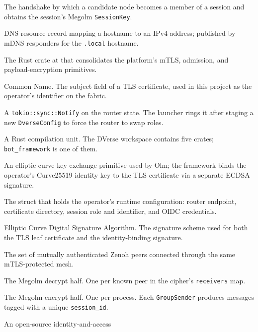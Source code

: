 \documentclass[11pt,a4paper]{article}
\begin{document}
\begin{description}[leftmargin=2.4cm, style=nextline, font=\sffamily\bfseries]
  \item[admission] The handshake by which a candidate node
        becomes a member of a session and obtains the
        session's Megolm \texttt{SessionKey}.
  \item[A record] DNS resource record mapping a hostname to
        an IPv4 address; published by mDNS responders for the
        \texttt{.local} hostname.
  \item[bot\_framework] The Rust crate at
         that consolidates the
        platform's mTLS, admission, and payload-encryption
        primitives.
  \item[CN] Common Name. The subject field of a TLS
        certificate, used in this project as the operator's
        identifier on the fabric.
  \item[\texttt{config\_changed}] A \texttt{tokio::sync::Notify}
        on the router state. The launcher rings it after
        staging a new \texttt{DverseConfig} to force the
        router to swap roles.
  \item[crate] A Rust compilation unit. The DVerse workspace
        contains five crates; \texttt{bot\_framework} is one
        of them.
  \item[Curve25519] An elliptic-curve key-exchange primitive
        used by Olm; the framework binds the operator's
        Curve25519 identity key to the TLS certificate via a
        separate ECDSA signature.
  \item[DverseConfig] The struct that holds the operator's
        runtime configuration: router endpoint, certificate
        directory, session role and identifier, and OIDC
        credentials.
  \item[ECDSA] Elliptic Curve Digital Signature Algorithm. The
        signature scheme used for both the TLS leaf
        certificate and the identity-binding signature.
  \item[fabric] The set of mutually authenticated Zenoh peers
        connected through the same mTLS-protected mesh.
  \item[GroupReceiver] The Megolm decrypt half. One per known
        peer in the cipher's \texttt{receivers} map.
  \item[GroupSender] The Megolm encrypt half. One per
        process. Each \texttt{GroupSender} produces messages
        tagged with a unique \texttt{session\_id}.
  \item[Keycloak] An open-source identity-and-access

\end{description}
\end{document}
